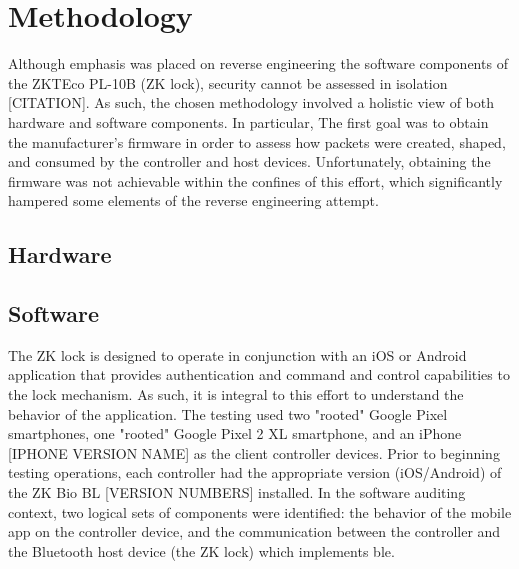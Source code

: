 \documentclass[journal]{IEEEtran}
\begin{document}



\section{Methodology}

Although emphasis was placed on reverse engineering the software components of the ZKTEco PL-10B (ZK lock), security cannot be assessed in isolation [CITATION].  As such, the chosen methodology involved a holistic view of both hardware and software components.  In particular, The first goal was to obtain the manufacturer's firmware in order to assess how packets were created, shaped, and consumed by the controller and host devices.  Unfortunately, obtaining the firmware was not achievable within the confines of this effort, which significantly hampered some elements of the reverse engineering attempt.

\subsection{Hardware}



\subsection{Software}


The ZK lock is designed to operate in conjunction with an iOS or Android application that provides authentication and command and control capabilities to the lock mechanism.  As such, it is integral to this effort to understand the behavior of the application.  The testing used two "rooted" Google Pixel smartphones, one "rooted" Google Pixel 2 XL smartphone, and an iPhone [IPHONE VERSION NAME] as the client controller devices.  Prior to beginning testing operations, each controller had the appropriate version (iOS/Android) of the ZK Bio BL [VERSION NUMBERS] installed.  In the software auditing context, two logical sets of components were identified: the behavior of the mobile app on the controller device, and the communication between the controller and the Bluetooth host device (the ZK lock) which implements \gls{ble}.
\end{document}
